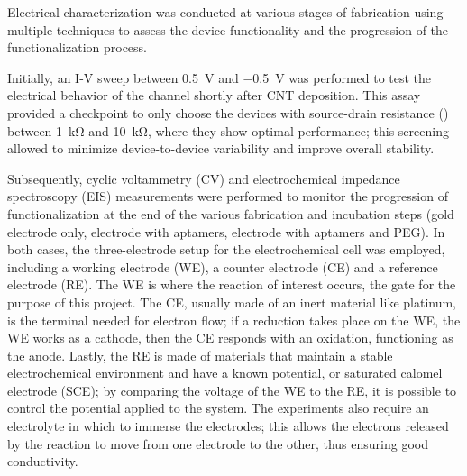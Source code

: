 Electrical characterization was conducted at various stages of fabrication using multiple techniques to assess the device functionality and the progression of the functionalization process.

Initially, an I-V sweep between \SI{0.5}{\V} and \SI{-0.5}{\V} was performed to
test the electrical behavior of the channel shortly after CNT deposition. This
assay provided a checkpoint to only choose the devices with source-drain
resistance (\rds{}) between \SI{1}{\kohm} and \SI{10}{\kohm}, \ie{} where they
show optimal performance; this screening allowed to minimize device-to-device
variability and improve overall stability.

Subsequently, cyclic voltammetry (CV) and electrochemical impedance spectroscopy
(EIS) measurements were performed to monitor the progression of
functionalization at the end of the various fabrication and incubation steps
(gold electrode only, electrode with aptamers, electrode with aptamers and PEG).
In both cases, the three-electrode setup for the electrochemical cell was
employed, including a working electrode (WE), a counter electrode (CE) and a
reference electrode (RE). The WE is where the reaction of interest occurs, \ie{}
the gate for the purpose of this project. The CE, usually made of an inert
material like platinum, is the terminal needed for electron flow; if a reduction
takes place on the WE, \ie{} the WE works as a cathode, then the CE responds
with an oxidation, functioning as the anode. Lastly, the RE is made of materials
that maintain a stable electrochemical environment and have a known potential,
\eg{}  or saturated calomel electrode (SCE); by comparing the
voltage of the WE to the RE, it is possible to control the potential applied to
the system. The experiments also require an electrolyte in which to immerse the
electrodes; this allows the electrons released by the reaction to move from one
electrode to the other, thus ensuring good conductivity.

